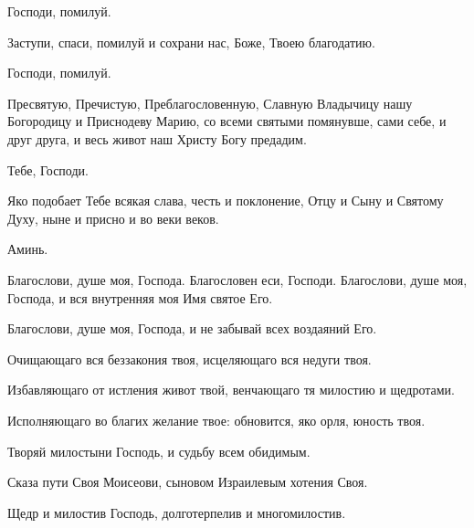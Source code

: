 \begin{mymulticols}
 Господи, помилуй.

 Заступи, спаси, помилуй и сохрани нас, Боже, Твоею благодатию. 

 Господи, помилуй.

 Пресвятую, Пречистую, Преблагословенную, Славную Владычицу нашу Богородицу и Приснодеву Марию, со всеми святыми помянувше, сами себе, и друг друга, и весь живот наш Христу Богу предадим. 

 Тебе, Господи. 

 Яко подобает Тебе всякая слава, честь и поклонение, Отцу и Сыну и Святому Духу, ныне и присно и во веки веков. 

 Аминь.





 Благослови, душе моя, Господа. Благословен еси, Господи. Благослови, душе моя, Господа, и вся внутренняя моя Имя святое Его. 

 Благослови, душе моя, Господа, и не забывай всех воздаяний Его. 

 Очищающаго вся беззакония твоя, исцеляющаго вся недуги твоя. 

 Избавляющаго от истления живот твой, венчающаго тя милостию и щедротами. 

 Исполняющаго во благих желание твое: обновится, яко орля, юность твоя. 

 Творяй милостыни Господь, и судьбу всем обидимым. 

 Сказа пути Своя Моисеови, сыновом Израилевым хотения Своя. 

 Щедр и милостив Господь, долготерпелив и многомилостив.


\end{mymulticols}

